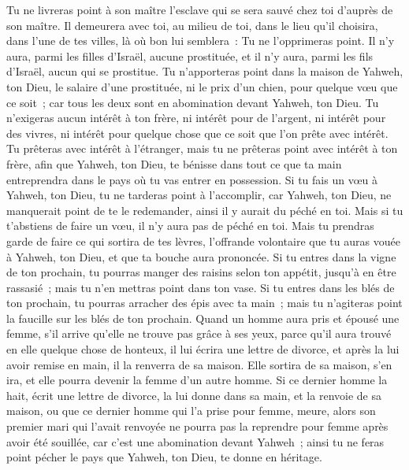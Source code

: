 \begin{multicols}{2}
Tu ne livreras point à son maître l'esclave qui se sera sauvé chez toi d'auprès de son maître.
Il demeurera avec toi, au milieu de toi, dans le lieu qu'il choisira, dans l'une de tes villes, là où bon lui semblera~: Tu ne l'opprimeras point.
Il n'y aura, parmi les filles d'Israël, aucune prostituée, et il n'y aura, parmi les fils d'Israël, aucun qui se prostitue.
Tu n'apporteras point dans la maison de Yahweh, ton Dieu, le salaire d'une prostituée, ni le prix d'un chien, pour quelque vœu que ce soit~; car tous les deux sont en abomination devant Yahweh, ton Dieu.
Tu n'exigeras aucun intérêt à ton frère, ni intérêt pour de l'argent, ni intérêt pour des vivres, ni intérêt pour quelque chose que ce soit que l'on prête avec intérêt.
Tu prêteras avec intérêt à l'étranger, mais tu ne prêteras point avec intérêt à ton frère, afin que Yahweh, ton Dieu, te bénisse dans tout ce que ta main entreprendra dans le pays où tu vas entrer en possession.
Si tu fais un vœu à Yahweh, ton Dieu, tu ne tarderas point à l'accomplir, car Yahweh, ton Dieu, ne manquerait point de te le redemander, ainsi il y aurait du péché en toi.
Mais si tu t'abstiens de faire un vœu, il n'y aura pas de péché en toi.
Mais tu prendras garde de faire ce qui sortira de tes lèvres, l'offrande volontaire que tu auras vouée à Yahweh, ton Dieu, et que ta bouche aura prononcée.
Si tu entres dans la vigne de ton prochain, tu pourras manger des raisins selon ton appétit, jusqu'à en être rassasié~; mais tu n'en mettras point dans ton vase.
Si tu entres dans les blés de ton prochain, tu pourras arracher des épis avec ta main~; mais tu n'agiteras point la faucille sur les blés de ton prochain.
\VerseOne{}Quand un homme aura pris et épousé une femme, s'il arrive qu'elle ne trouve pas grâce à ses yeux, parce qu'il aura trouvé en elle quelque chose de honteux, il lui écrira une lettre de divorce, et après la lui avoir remise en main, il la renverra de sa maison.
Elle sortira de sa maison, s'en ira, et elle pourra devenir la femme d'un autre homme.
Si ce dernier homme la hait, écrit une lettre de divorce, la lui donne dans sa main, et la renvoie de sa maison, ou que ce dernier homme qui l'a prise pour femme, meure,
alors son premier mari qui l'avait renvoyée ne pourra pas la reprendre pour femme après avoir été souillée, car c'est une abomination devant Yahweh~; ainsi tu ne feras point pécher le pays que Yahweh, ton Dieu, te donne en héritage.

\end{multicols}
